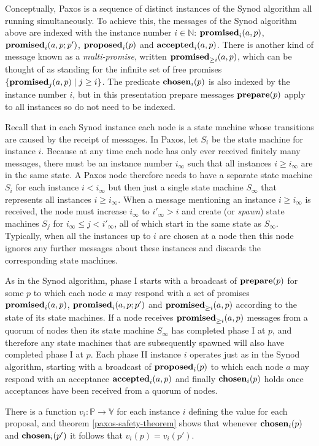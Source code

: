 \documentclass[journal]{IEEEtran}
\begin{document}
Conceptually, Paxos is a sequence of distinct instances of the Synod algorithm
all running simultaneously. To achieve this, the messages of the Synod
algorithm above are indexed with the instance number $i \in \mathbb N$:
$\mathbf{promised}_{i}(a,p)$, $\mathbf{promised}_{i}(a,p;p')$, $\mathbf{proposed}_{i}(p)$ and $\mathbf{accepted}_{i}(a,p)$.
There is another kind of message known as a \textit{multi-promise}, written
$\mathbf{promised}_{\ge i}(a,p)$, which can be thought of as standing for the infinite set of
free promises $\{ \mathbf{promised}_{j}(a,p) \mid j \ge i \}$. The predicate
$\mathbf{chosen}_{i}(p)$ is also indexed by the instance number $i$, but in this
presentation prepare messages $\mathbf{prepare}(p)$ apply to all instances so do not need
to be indexed.

Recall that in each Synod instance each node is a state machine whose
transitions are caused by the receipt of messages. In Paxos, let $S_i$ be the
state machine for instance $i$. Because at any time each node has only ever
received finitely many messages, there must be an instance number $i_\infty$
such that all instances $i \ge i_\infty$ are in the same state. A Paxos node
therefore needs to have a separate state machine $S_i$ for each instance $i <
i_\infty$ but then just a single state machine $S_\infty$ that represents all
instances $i \ge i_\infty$. When a message mentioning an instance $i \ge
i_\infty$ is received, the node must increase $i_\infty$ to $i'_\infty > i$ and
create (or \textit{spawn}) state machines $S_j$ for $i_\infty \le j <
i'_\infty$, all of which start in the same state as $S_\infty$. Typically, when
all the instances up to $i$ are chosen at a node then this node ignores any
further messages about these instances and discards the corresponding state
machines.

As in the Synod algorithm, phase I starts with a broadcast of $\mathbf{prepare}(p)$ for
some $p$ to which each node $a$ may respond with a set of promises
$\mathbf{promised}_{i}(a,p)$, $\mathbf{promised}_{i}(a,p;p')$ and $\mathbf{promised}_{\ge i}(a,p)$ according to the
state of its state machines. If a node receives $\mathbf{promised}_{\ge i}(a,p)$ messages from
a quorum of nodes then its state machine $S_\infty$ has completed phase I at
$p$, and therefore any state machines that are subsequently spawned will also
have completed phase I at $p$. Each phase II instance $i$ operates just as in
the Synod algorithm, starting with a broadcast of $\mathbf{proposed}_{i}(p)$ to which each
node $a$ may respond with an acceptance $\mathbf{accepted}_{i}(a,p)$ and finally
$\mathbf{chosen}_{i}(p)$ holds once acceptances have been received from a quorum of
nodes.

There is a function $v_i : \mathbb P \to \mathbb V$ for each instance $i$
defining the value for each proposal, and theorem \ref{paxos-safety-theorem}
shows that whenever $\mathbf{chosen}_{i}(p)$ and $\mathbf{chosen}_{i}(p')$ it follows that
$v_i(p) = v_i(p')$.
\end{document}
